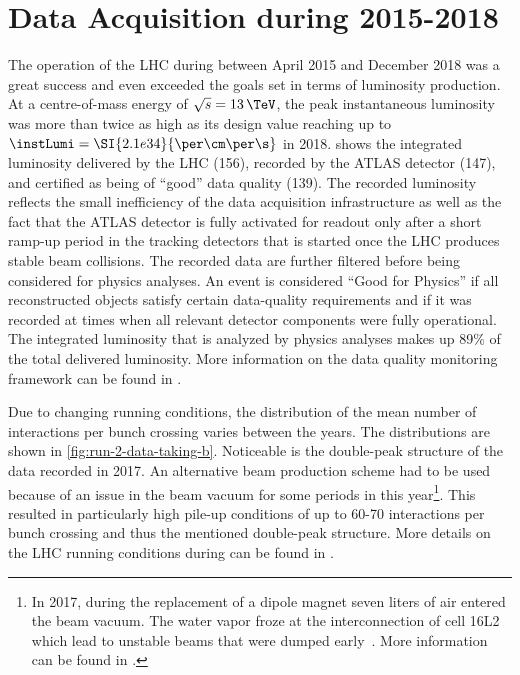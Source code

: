 \section{Data Acquisition during 2015-2018}
\label{sec:run-2-data-taking}
The operation of the LHC during \RunTwo between April 2015 and December 2018 was a great success and even exceeded the goals set in terms of luminosity production. At a centre-of-mass energy of $\sqrt{s} = 13\,\TeV$, the peak instantaneous luminosity was more than twice as high as its design value reaching up to $\instLumi = \SI{2.1e34}{\per\cm\per\s}$ in 2018.
 shows the integrated luminosity delivered by the LHC (156\ifb), recorded by the ATLAS detector (147\ifb), and certified as being of ``good'' data quality (139\ifb).
The recorded luminosity reflects the small inefficiency of the data acquisition infrastructure as well as the fact that the ATLAS detector is fully activated for readout only after a short ramp-up period in the tracking detectors that is started once the LHC produces stable beam collisions.
The recorded data are further filtered before being considered for physics analyses.
An event is considered ``Good for Physics'' if all reconstructed objects satisfy certain data-quality requirements and if it was recorded at times when all relevant detector components were fully operational.
The integrated luminosity that is analyzed by physics analyses makes up 89\% of the total delivered luminosity.
More information on the data quality monitoring framework can be found in .

Due to changing running conditions, the distribution of the mean number of interactions per bunch crossing varies between the years.
The distributions are shown in \cref{fig:run-2-data-taking-b}.
Noticeable is the double-peak structure of the data recorded in 2017.
An alternative beam production scheme had to be used because of an issue in the beam vacuum for some periods in this year\footnote{In 2017, during the replacement of a dipole magnet seven liters of air entered the beam vacuum. The water vapor froze at the interconnection of cell 16L2 which lead to unstable beams that were dumped early~\cite{Jimenez:2646067,Salvant:2646056}. More information can be found in .}. This resulted in particularly high pile-up conditions of up to 60-70 interactions per bunch crossing and thus the mentioned double-peak structure.
More details on the LHC running conditions during \RunTwo can be found in .

